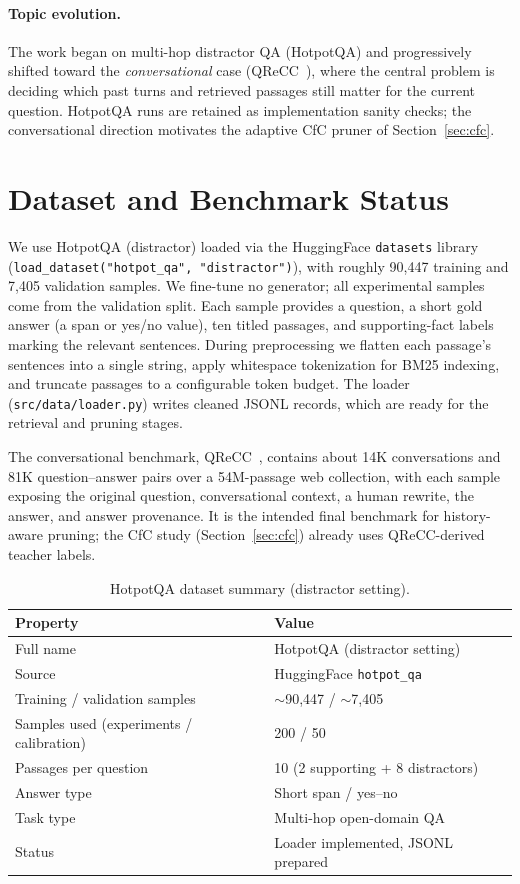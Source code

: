 \documentclass[runningheads]{llncs}
\begin{document}
\paragraph{Topic evolution.}
The work began on multi-hop distractor QA (HotpotQA) and progressively shifted
toward the \emph{conversational} case (QReCC~\cite{anantha2021qrecc}), where the
central problem is deciding which past turns and retrieved passages still matter
for the current question. HotpotQA runs are retained as implementation sanity
checks; the conversational direction motivates the adaptive CfC pruner of
Section~\ref{sec:cfc}.

\section{Dataset and Benchmark Status}

We use HotpotQA (distractor) loaded via the HuggingFace \texttt{datasets}
library (\texttt{load\_dataset("hotpot\_qa", "distractor")}), with roughly
90{,}447 training and 7{,}405 validation samples. We fine-tune no generator;
all experimental samples come from the validation split. Each sample provides a
question, a short gold answer (a span or yes/no value), ten titled passages,
and supporting-fact labels marking the relevant sentences. During preprocessing
we flatten each passage's sentences into a single string, apply whitespace
tokenization for BM25 indexing, and truncate passages to a configurable token
budget. The loader (\texttt{src/data/loader.py}) writes cleaned JSONL records,
which are ready for the retrieval and pruning stages.

The conversational benchmark, QReCC~\cite{anantha2021qrecc}, contains about
14K conversations and 81K question--answer pairs over a 54M-passage web
collection, with each sample exposing the original question, conversational
context, a human rewrite, the answer, and answer provenance. It is the intended
final benchmark for history-aware pruning; the CfC study (Section~\ref{sec:cfc})
already uses QReCC-derived teacher labels.

\begin{table}[t]
\centering
\caption{HotpotQA dataset summary (distractor setting).}\label{tab:dataset}
\begin{tabular}{ll}
\toprule
\textbf{Property} & \textbf{Value}\\
\midrule
Full name & HotpotQA (distractor setting)\\
Source & HuggingFace \texttt{hotpot\_qa}\\
Training / validation samples & $\sim$90{,}447 / $\sim$7{,}405\\
Samples used (experiments / calibration) & 200 / 50\\
Passages per question & 10 (2 supporting + 8 distractors)\\
Answer type & Short span / yes--no\\
Task type & Multi-hop open-domain QA\\
Status & Loader implemented, JSONL prepared\\
\bottomrule
\end{tabular}
\end{table}
\end{document}

